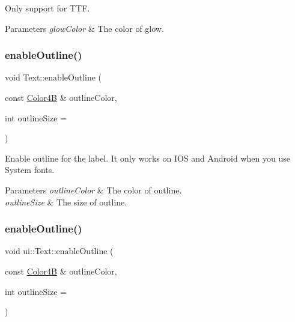 Only support for T\+TF.


\begin{DoxyParams}{Parameters}
{\em glow\+Color} & The color of glow. \\
\hline
\end{DoxyParams}
\mbox{\label{classui_1_1Text_a435c6f84cf8281e81f23e1752edabf1d}} 
\subsubsection{\texorpdfstring{enable\+Outline()}{enableOutline()}\hspace{0.1cm}{\footnotesize\ttfamily [1/2]}}
{\footnotesize\ttfamily void Text\+::enable\+Outline (\begin{DoxyParamCaption}\item[{const \hyperlink{structColor4B}{Color4B} \&}]{outline\+Color,  }\item[{int}]{outline\+Size = {} }\end{DoxyParamCaption})}

Enable outline for the label. It only works on I\+OS and Android when you use System fonts.


\begin{DoxyParams}{Parameters}
{\em outline\+Color} & The color of outline. \\
\hline
{\em outline\+Size} & The size of outline. \\
\hline
\end{DoxyParams}
\mbox{\label{classui_1_1Text_a15c3d89aa5f6340b32224660ebc40b7e}} 
\subsubsection{\texorpdfstring{enable\+Outline()}{enableOutline()}\hspace{0.1cm}{\footnotesize\ttfamily [2/2]}}
{\footnotesize\ttfamily void ui\+::\+Text\+::enable\+Outline (\begin{DoxyParamCaption}\item[{const \hyperlink{structColor4B}{Color4B} \&}]{outline\+Color,  }\item[{int}]{outline\+Size = {} }\end{DoxyParamCaption})}

